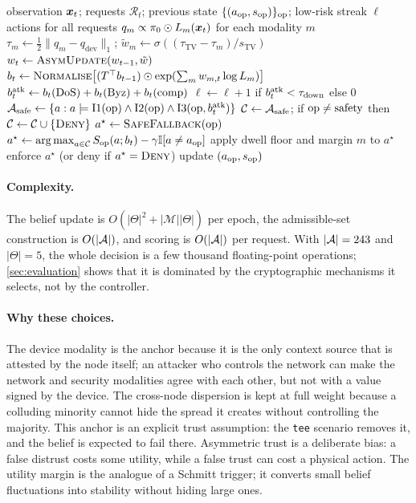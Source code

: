 \begin{algorithm}[t]
\caption{Fail-safe context-adaptive enforcement (per epoch)}
\label{alg:controller}
\begin{algorithmic}[1]
\Require observation $\boldsymbol{x}_t$; requests $\mathcal{R}_t$; previous state
$\{(a_{\mathrm{op}},s_{\mathrm{op}})\}_{\mathrm{op}}$; low-risk streak $\ell$
\Ensure actions for all requests
\State $q_m\propto\pi_0\odot L_m(\boldsymbol{x}_t)$ for each modality $m$
\State $\tau_m\gets\tfrac12\lVert q_m-q_{\mathrm{dev}}\rVert_1$;\quad
       $\tilde w_m\gets\sigma((\tau_{\mathrm{TV}}-\tau_m)/s_{\mathrm{TV}})$
\State $w_t\gets\textsc{AsymUpdate}(w_{t-1},\tilde w)$ 
\State $b_t\gets\textsc{Normalise}\big[(T^{\top}b_{t-1})\odot
       \exp(\sum_m w_{m,t}\log L_m)\big]$ 
\State $b^{\mathrm{atk}}_t\gets b_t(\text{DoS})+b_t(\text{Byz})+b_t(\text{comp})$
\State $\ell\gets\ell+1$ if $b^{\mathrm{atk}}_t<\tau_{\mathrm{down}}$ else $0$
  \State $\mathcal{A}_{\mathrm{safe}}\gets\{a:a\models\mathrm{I1}(\mathrm{op})\land\mathrm{I2}(\mathrm{op})\land
         \mathrm{I3}(\mathrm{op},b^{\mathrm{atk}}_t)\}$
  \State $\mathcal{C}\gets\mathcal{A}_{\mathrm{safe}}$;\quad
         if $\mathrm{op}\neq\text{safety}$ then $\mathcal{C}\gets\mathcal{C}\cup\{\textsc{Deny}\}$
     \State $a^{\star}\gets\textsc{SafeFallback}(\mathrm{op})$ 
  \Else
     \State $a^{\star}\gets\operatorname*{arg\,max}_{a\in\mathcal{C}}S_{\mathrm{op}}(a;b_t)-\gamma\mathbb{I}\!\left[a\neq a_{\mathrm{op}}\right]$
     \State apply dwell floor and margin $m$ to $a^{\star}$
  \EndIf
  \State enforce $a^{\star}$ (or deny if $a^{\star}=\textsc{Deny}$)
  \State update $(a_{\mathrm{op}},s_{\mathrm{op}})$
\EndFor
\end{algorithmic}
\end{algorithm}

\paragraph{Complexity.} The belief update is $O(|\Theta|^2+|\mathcal{M}||\Theta|)$
per epoch, the admissible-set construction is $O(|\mathcal{A}|)$, and scoring is
$O(|\mathcal{A}|)$ per request. With $|\mathcal{A}|=243$ and $|\Theta|=5$, the whole
decision is a few thousand floating-point operations; \cref{sec:evaluation}
shows that it is dominated by the cryptographic mechanisms it selects, not by
the controller.

\paragraph{Why these choices.}
The device modality is the anchor because it is the only context source that is
attested by the node itself; an attacker who controls the network can make the
network and security modalities agree with each other, but not with a value
signed by the device. The cross-node dispersion is kept at full weight because a
colluding minority cannot hide the spread it creates without controlling the
majority. This anchor is an explicit trust assumption: the \texttt{tee}
scenario removes it, and the belief is expected to fail there. Asymmetric trust is a deliberate bias: a false distrust costs some
utility, while a false trust can cost a physical action. The utility margin is
the analogue of a Schmitt trigger; it converts small belief fluctuations into
stability without hiding large ones.
